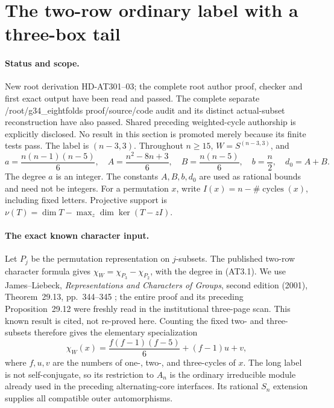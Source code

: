 \section{The two-row ordinary label with a three-box tail}
\label{sec:alternating-three-row-tail}

\paragraph{Status and scope.}
New root derivation HD-AT301--03; the complete root author proof,
checker and first exact output have been read and passed.
The complete separate /root/g34\_eightfolds proof/source/code
audit and its distinct actual-subset reconstruction have also passed.
Shared preceding weighted-cycle authorship is explicitly disclosed.  No result in this section is promoted merely
because its finite tests pass.  The label is $(n-3,3)$.
Throughout $n\ge15$, $W=S^{(n-3,3)}$, and
\[
 a=\frac{n(n-1)(n-5)}6,\quad
 A=\frac{n^2-8n+3}6,\quad B=\frac{n(n-5)}6,\quad
 b=\frac n2,\quad d_0=A+B.                              \tag{AT3.1}
\]
The degree $a$ is an integer. The constants $A,B,b,d_0$ are
used as rational bounds and need not be integers.
For a permutation $x$, write $I(x)=n-\#\operatorname{cycles}(x)$,
including fixed letters.  Projective support is
$\nu(T)=\dim T-\max_z\dim\ker(T-zI)$.

\paragraph{The exact known character input.}
Let $P_j$ be the permutation representation on $j$-subsets.
The published two-row character formula gives
$\chi_W=\chi_{P_3}-\chi_{P_2}$, with the degree in (AT3.1).
We use James--Liebeck, \emph{Representations and Characters of
Groups}, second edition (2001), Theorem~29.13, pp.~344--345
\cite[Theorem~29.13, pp.~344--345]{HD:JamesLiebeck2001};
the entire proof and its preceding Proposition~29.12 were freshly
read in the institutional three-page scan.  This known result is
cited, not re-proved here.  Counting the fixed two- and three-subsets
therefore gives the elementary specialization
\[
 \chi_W(x)=\frac{f(f-1)(f-5)}6+(f-1)u+v,                 \tag{AT3.2}
\]
where $f,u,v$ are the numbers of one-, two-, and three-cycles of $x$.
The long label is not self-conjugate, so its restriction to $A_n$
is the ordinary irreducible module already used in the preceding
alternating-core interfaces.  Its rational $S_n$ extension supplies
all compatible outer automorphisms.

